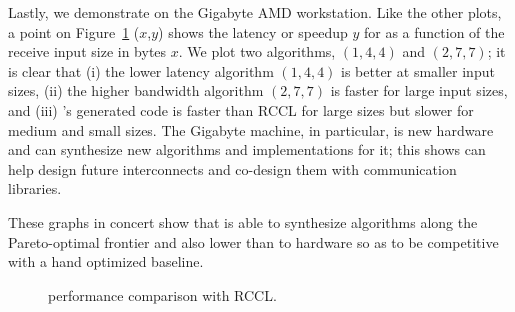Lastly, we demonstrate \allgather on the Gigabyte AMD workstation.
Like the other plots, a point on Figure~\ref{fig:amd-res-allgather}
($x$,$y$) shows the latency or speedup $y$ for \allgather as a
function of the receive input size in bytes $x$.  We plot two
algorithms, $(1,4,4)$ and $(2,7,7)$; it is clear that (i) the lower
latency algorithm $(1,4,4)$ is better at smaller input sizes, (ii) the
higher bandwidth algorithm $(2,7,7)$ is faster for large input sizes,
and (iii) \tool's generated code is faster than RCCL for large sizes
but slower for medium and small sizes. The Gigabyte machine, in
particular, is new hardware and \tool{} can synthesize new algorithms
and implementations for it; this shows \tool{} can help design future
interconnects and co-design them with communication libraries.

These graphs in concert show that \tool{} is able to synthesize
algorithms along the Pareto-optimal frontier and also lower than to
hardware so as to be competitive with a hand optimized baseline.

\begin{figure}[tbp]
  \centering
  \hfill
  \caption{\allgather performance comparison with RCCL.}
  \label{fig:amd-res-allgather}
\end{figure}
